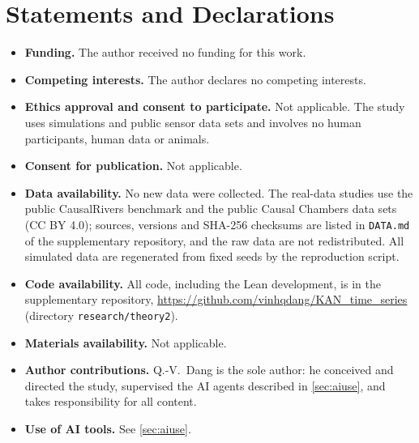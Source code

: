 \documentclass[pdflatex,sn-apa]{sn-jnl}
\theoremstyle{thmstyleone}
\theoremstyle{thmstylethree}
\theoremstyle{thmstyletwo}
\begin{document}
\section*{Statements and Declarations}

\begin{itemize}
\item \textbf{Funding.} The author received no funding for this work.
\item \textbf{Competing interests.} The author declares no competing interests.
\item \textbf{Ethics approval and consent to participate.} Not applicable.
The study uses simulations and public sensor data sets and involves no human
participants, human data or animals.
\item \textbf{Consent for publication.} Not applicable.
\item \textbf{Data availability.} No new data were collected. The real-data
studies use the public CausalRivers benchmark \citep{stein2025causalrivers} and
the public Causal Chambers data sets \citep{gamella2025chambers} (CC BY 4.0);
sources, versions and SHA-256 checksums are listed in \texttt{DATA.md} of the
supplementary repository, and the raw data are not redistributed. All
simulated data are regenerated from fixed seeds by the reproduction script.
\item \textbf{Code availability.} All code, including the Lean development, is
in the supplementary repository,
\url{https://github.com/vinhqdang/KAN_time_series} (directory \texttt{research/theory2}).
\item \textbf{Materials availability.} Not applicable.
\item \textbf{Author contributions.} Q.-V.~Dang is the sole author: he
conceived and directed the study, supervised the AI agents described in
\cref{sec:aiuse}, and takes responsibility for all content.
\item \textbf{Use of AI tools.} See \cref{sec:aiuse}.
\end{itemize}

\begin{appendices}
\renewcommand{\theHfigure}{\thefigure}\renewcommand{\theHtable}{\thetable}

\end{appendices}


\end{document}
